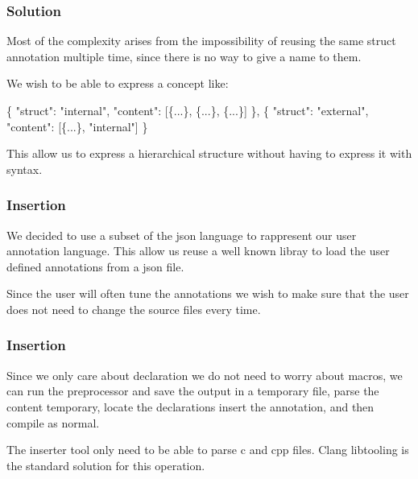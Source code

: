 \documentclass{beamer}
\begin{document}
\begin{frame}[fragile]
	\frametitle{Solution}
	\begin{block}{}
	Most of the complexity arises from the impossibility of reusing the same struct annotation multiple time, since there is no way to give a name to them.

	We wish to be able to express a concept like:
	\end{block}

	\begin{alertblock}{}
	\begin{semiverbatim}	
		\{
		\quad "struct": "internal",
		\quad "content": [\{...\}, \{...\}, \{...\}]
		\},
		\{
		\quad "struct": "external",
		\quad "content": [\{...\}, "internal"]
		\}
	\end{semiverbatim}
	\end{alertblock}

	\begin{block}{}
	This allow us to express a hierarchical structure without having to express it with syntax.
	\end{block}

\end{frame}
\begin{frame}[fragile]
	\frametitle{Insertion}
	\begin{block}{}
	We decided to use a subset of the json language to rappresent our user annotation language.
	This allow us reuse a well known libray to load the user defined annotations from a json file.
	\end{block}
	\begin{block}{}
		Since the user will often tune the annotations we wish to make sure that the user does not need to change the source files every time. 
	\end{block}

\end{frame}
\begin{frame}[fragile]
	\frametitle{Insertion}
	\begin{block}{}
		Since we only care about declaration we do not need to worry about macros, we can run the preprocessor and save the output in a temporary file, parse the content temporary, locate the declarations insert the annotation, and then compile as normal. 
	\end{block}
	
	\begin{block}{}
		The inserter tool only need to be able to parse c and cpp files. Clang libtooling is the standard solution for this operation.
	\end{block}

\end{frame}
\end{document}

